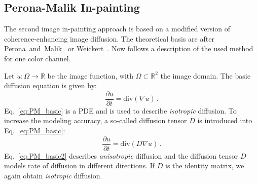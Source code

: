 \subsection{Perona-Malik In-painting}
\label{ssec:num42}
The second image in-painting approach is based on a modified version of coherence-enhancing image diffusion. The theoretical basis are after Perona~and~Malik~\cite{Perona90} or Weickert~\cite{weickert98}. Now follows a description of the used method for one color channel.

Let $u : \Omega \rightarrow \mathbb{R}$ be the image function, with $  \Omega \subset \mathbb{R}^2$ the image domain. The basic diffusion equation is given by: \begin{equation}\frac{\partial u}{\partial t}=\text{div}(\nabla u)\,.
\label{eq:PM_basic}
\end{equation}
Eq.~\eqref{eq:PM_basic} is a PDE and is used to describe \textit{isotropic} diffusion. To increase the modeling accuracy, a so-called diffusion tensor $D$ is introduced into Eq.~\eqref{eq:PM_basic}:
\begin{equation}
\frac{\partial u}{\partial t} = \text{div}(D\nabla u)\,.
\label{eq:PM_basic2}
\end{equation}
Eq.~\eqref{eq:PM_basic2} describes \textit{anisotropic} diffusion and the diffusion tensor $D$ models rate of diffusion in different directions. If $D$ is the identity matrix, we again obtain \textit{isotropic} diffusion. 

